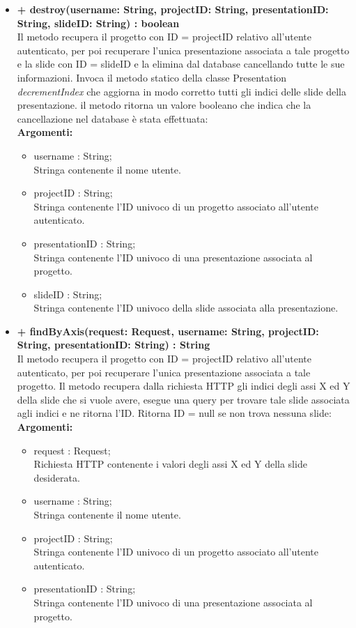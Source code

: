 \begin{itemize}
			\item \textbf{+ destroy(username: String, projectID: String, presentationID: String, slideID: String) : boolean}\\
				Il metodo recupera il progetto con ID = projectID relativo all'utente autenticato, per poi recuperare l'unica presentazione associata a tale progetto e la slide con ID = slideID e la elimina dal database cancellando tutte le sue informazioni. Invoca il metodo statico della classe Presentation \textit{decrementIndex} che aggiorna in modo corretto tutti gli indici delle slide della presentazione. il metodo ritorna un valore booleano che indica che la cancellazione nel database è stata effettuata:\\
				\textbf{Argomenti:}
				\begin{itemize}
					\item username : String; \\
					Stringa contenente il nome utente.
					\item projectID : String; \\
					Stringa contenente l'ID univoco di un progetto associato all'utente autenticato.
					\item presentationID : String; \\
					Stringa contenente l'ID univoco di una presentazione associata al progetto.
					\item slideID : String; \\
					Stringa contenente l'ID univoco della slide associata alla presentazione.
				\end{itemize}
				
			\item \textbf{+ findByAxis(request: Request, username: String, projectID: String, presentationID: String) : String}\\
			Il metodo recupera il progetto con ID = projectID relativo all'utente autenticato, per poi recuperare l'unica presentazione associata a tale progetto. Il metodo recupera dalla richiesta HTTP gli indici degli assi X ed Y della slide che si vuole avere, esegue una query per trovare tale slide associata agli indici e ne ritorna l'ID. Ritorna ID = null se non trova nessuna slide:\\
			\textbf{Argomenti:}
			\begin{itemize}
				\item request : Request;\\
				Richiesta HTTP contenente i valori degli assi X ed Y della slide desiderata.
				\item username : String; \\
				Stringa contenente il nome utente.
				\item projectID : String; \\
				Stringa contenente l'ID univoco di un progetto associato all'utente autenticato.
				\item presentationID : String; \\
				Stringa contenente l'ID univoco di una presentazione associata al progetto.
			\end{itemize}
\end{itemize}

